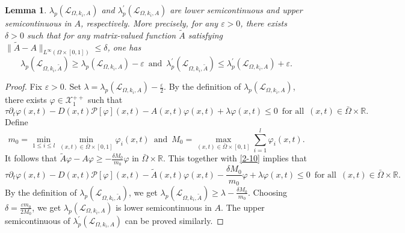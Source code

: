 \documentclass[11pt,reqno]{amsart}
\newtheorem{lemma}[theorem]{Lemma}
\numberwithin{equation}{section}
\begin{document}
\begin{lemma}\label{SEMI}
$\lambda_{p}(\mathcal{L}_{\Omega, k_{i}, A})$ and $\lambda_{p}^{\prime}(\mathcal{L}_{\Omega, k_{i}, A})$ are lower semicontinuous and upper semicontinuous in $A$, respectively.
More precisely, for any $\varepsilon>0$, there exists $\delta>0$ such that for any matrix-valued
function $\tilde{A}$ satisfying $\| \tilde{A}-A\|_{L^{\infty}(\Omega\times[0,1])}\le \delta$, one has
\begin{equation*}
\lambda_{p}(\mathcal{L}_{\Omega,k_i,\tilde{A} })
\geq
\lambda_{p}(\mathcal{L}_{\Omega,k_i,A})-\varepsilon
\enspace \text{and} \enspace
\lambda_{p}^{\prime}(\mathcal{L}_{\Omega,k_i,\tilde{A} })
\leq
\lambda_{p}^{\prime}(\mathcal{L}_{\Omega,k_i,A})+\varepsilon.
\end{equation*}
\end{lemma}
\begin{proof}
Fix $\varepsilon>0$. Set $\lambda = \lambda_{p}(\mathcal{L}_{\Omega,k_i,A}) - \frac{\varepsilon}{2}$.
By the definition of $\lambda_{p}(\mathcal{L}_{\Omega, k_{i}, A})$, there exists $\varphi \in \mathcal{X}_{1}^{++}$ such that
%
\begin{equation}\label{2-10}
\tau \partial_{t} \varphi(x,t) - D(x,t)\mathcal{P}[\varphi](x,t) - A(x,t)\varphi(x,t) + \lambda\varphi(x,t) \leq 0
\enspace \text{for all} \enspace (x,t)\in\bar{\Omega}\times \mathbb{R}.
\end{equation}
Define
\begin{equation*}
m_{0} = \min_{1\leq i \leq l} \min_{(x,t)\in\bar{\Omega}\times [0,1]} \varphi_{i}(x,t)
\enspace \text{and} \enspace
M_{0} = \max_{(x,t)\in\bar{\Omega}\times[0,1]} \sum_{i=1}^{l} \varphi_{i}(x,t).
\end{equation*}
It follows that $\tilde{A}\varphi - A\varphi \geq -\frac{\delta M_{0}}{m_{0}}\varphi$ in $\bar{\Omega}\times \mathbb{R}$. This together with \eqref{2-10} implies that
\begin{equation*}
\tau \partial_{t} \varphi(x,t) - D(x,t)\mathcal{P}[\varphi](x,t) - \tilde{A}(x,t)\varphi(x,t) - \frac{\delta M_{0}}{m_{0}}\varphi + \lambda\varphi(x,t) \leq 0
\enspace \text{for all} \enspace (x,t)\in\bar{\Omega}\times \mathbb{R}.
\end{equation*}
By the definition of $\lambda_{p}(\mathcal{L}_{\Omega,k_i,\tilde{A} })$, we get $\lambda_{p}(\mathcal{L}_{\Omega,k_i,\tilde{A} }) \geq \lambda - \frac{\delta M_{0}}{m_{0}}$. Choosing $\delta = \frac{\varepsilon m_{0}}{2M_{0}}$, we get $\lambda_{p}(\mathcal{L}_{\Omega,k_{i},A})$ is lower semicontinuous in $A$. The upper semicontinuous of $\lambda_{p}^{\prime}(\mathcal{L}_{\Omega,k_{i},A})$ can be proved similarly.
\end{proof}
\end{document}
